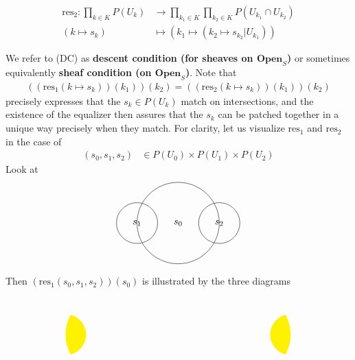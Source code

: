 \begin{exa}
\begin{enumerate}
\begin{align*}
  \mathrm{res}_{2}
  \colon
  \prod_{k \in K}
  P(U_{k})
  &\rightarrow
  \prod_{k_{1} \in K}
  \prod_{k_{2} \in K}
  P
  \left(
    U_{k_{1}}
    \cap
    U_{k_{2}}
  \right)
  \\
  \left(
    k
    \mapsto
    s_{k}
  \right)
  &\mapsto
  \left(
    k_{1}
    \mapsto
    \left(
      k_{2}
      \mapsto
      s_{k_{2}}
      \vert
      U_{k_{1}}
    \right)
  \right)
\end{align*}
\end{enumerate}
We refer to (DC) as \textbf{descent condition (for sheaves on $\mathbf{Open}_{S}$)} or sometimes equivalently \textbf{sheaf condition (on $\mathbf{Open}_{S}$)}.
Note that\begin{align*}
  \left(
    \left(
      \mathrm{res}_{1}
      \left(
        k
        \mapsto
        s_{k}
      \right)
    \right)
    (k_{1})
  \right)
  (k_{2})
  =
  \left(
    \left(
      \mathrm{res}_{2}
      \left(
        k
        \mapsto
        s_{k}
      \right)
    \right)
    (k_{1})
  \right)
  (k_{2})
\end{align*}
precisely expresses that the $s_{k} \in P(U_{k})$ match on intersections, and the existence of the equalizer then assures that the $s_{k}$ can be patched together in a unique way precisely when they match.
For clarity, let us visualize $\mathrm{res}_{1}$ and $\mathrm{res}_{2}$ in the case of
\begin{align*}
  (s_{0},s_{1},s_{2})
  &\in
  P(U_{0})
  \times
  P(U_{1})
  \times
  P(U_{2})
\end{align*}
Look at
\[
\begin{tikzpicture}[scale=0.75]
  \draw
    (0,0)
    circle
    [radius=2]
    node {$s_{0}$};
  \draw
    (-2,0)
    circle
    [radius=1]
    node {$s_{1}$};
  \draw
    (2,0)
    circle
    [radius=1]
    node {$s_{2}$};
\end{tikzpicture}
\]
Then $(\mathrm{res}_{1}(s_{0},s_{1},s_{2}))(s_{0})$ is illustrated by the three diagrams
\[
\begin{tikzpicture}[scale=0.75]
\begin{scope}
  \clip
    (0,0)
    circle
    [radius=2];
  \fill[fill=yellow]
    (-2,0)
    circle
    [radius=1];
  \clip
    (2,0)
    circle
    [radius=1];
\end{scope}
\begin{scope}
  \clip
    (7,0)
    circle
    [radius=2];
  \fill[fill=yellow]
    (9,0)
    circle
    [radius=1];
  \clip
    (5,0)
    circle
    [radius=1];
\end{scope}

\end{tikzpicture}\]
\end{exa}
